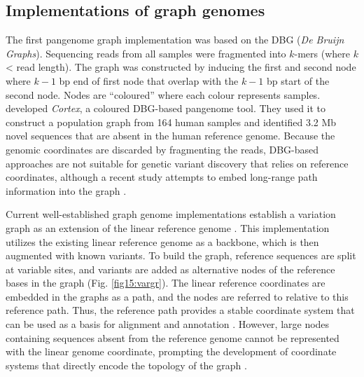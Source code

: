 \documentclass[../main.tex]{subfiles}
\begin{document}
\subsection*{Implementations of graph genomes}

The first pangenome graph implementation was based on the DBG (\emph{De Bruijn Graphs}). Sequencing reads from all samples were fragmented into $k$-mers (where $k$ < read length). The graph was constructed by inducing the first and second node where $k-1$ bp end of first node that overlap with the $k-1$ bp start of the second node. Nodes are “coloured” where each colour represents samples. \citet{iqbal2012novo} developed \emph{Cortex}, a coloured DBG-based pangenome tool. They used it to construct a population graph from 164 human samples and identified 3.2 Mb novel sequences that are absent in the human reference genome. Because the genomic coordinates are discarded by fragmenting the reads, DBG-based approaches are not suitable for genetic variant discovery that relies on reference coordinates, although a recent study attempts to embed long-range path information into the graph \citep{turner2018integrating}. 

Current well-established graph genome implementations establish a variation graph as an extension of the linear reference genome \citep{eggertsson2017graphtyper,garrison2018variation,sibbesen2018accurate,rakocevic2019fast,kim2019graph}. This implementation utilizes the existing linear reference genome as a backbone, which is then augmented with known variants. To build the graph, reference sequences are split at variable sites, and variants are added as alternative nodes of the reference bases in the graph (Fig. \ref{fig15:vargr}). The linear reference coordinates are embedded in the graphs as a path, and the nodes are referred to relative to this reference path. Thus, the reference path provides a stable coordinate system that can be used as a basis for alignment and annotation \citep{garrison2018variation}. However, large nodes containing sequences absent from the reference genome cannot be represented with the linear genome coordinate, prompting the development of coordinate systems that directly encode the topology of the graph \citep{paten2017genome,eizenga2020pangenome}. 
\end{document}
